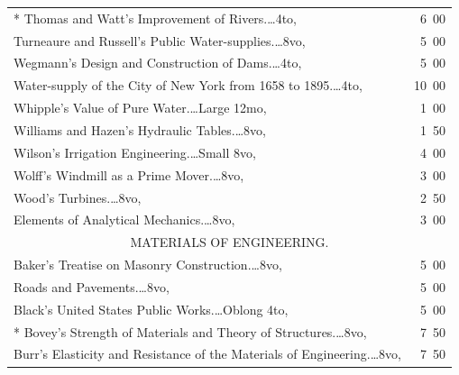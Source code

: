 \documentclass[a4paper,12pt]{book}[2004/02/16]
\theoremstyle{ilemma}
\theoremstyle{itheorem}
\theoremstyle{iother}
\theoremstyle{icorollary}
\theoremstyle{numcorollary}
\theoremstyle{idefinition}
\begin{document}
\begin{longtable}{@{}l@{ }r@{}}
* Thomas and Watt's Improvement of Rivers.\dotfill\ldots 4to, &6\ 00\\

Turneaure and Russell's Public Water-supplies.\dotfill\ldots 8vo, &5\ 00\\

Wegmann's Design and Construction of Dams.\dotfill\ldots 4to, &5\ 00\\

\nopagebreak

\indent Water-supply of the City of New York from 1658 to
1895.\dotfill\ldots 4to, &10\ 00\\

Whipple's Value of Pure Water.\dotfill\ldots Large 12mo, & 1\ 00\\

Williams and Hazen's Hydraulic Tables.\dotfill\ldots 8vo, &1\ 50\\

Wilson's Irrigation Engineering.\dotfill\ldots Small 8vo, &4\ 00\\

Wolff's Windmill as a Prime Mover.\dotfill\ldots 8vo, &3\ 00\\

Wood's Turbines.\dotfill\ldots 8vo, &2\ 50\\

\nopagebreak

\indent Elements of Analytical Mechanics.\dotfill\ldots 8vo, &3\ 00\\[2em]



\multicolumn{2}{c}{MATERIALS OF ENGINEERING.}\\[1em]

\nopagebreak

Baker's Treatise on Masonry Construction.\dotfill\ldots 8vo, &5\ 00\\

\nopagebreak

\indent Roads and Pavements.\dotfill\ldots 8vo, &5\ 00\\

Black's United States Public Works.\dotfill\ldots Oblong 4to, &5\ 00\\

* Bovey's Strength of Materials and Theory of
  Structures.\dotfill\ldots 8vo, &7\ 50\\

Burr's Elasticity and Resistance of the Materials of
Engineering.\dotfill\ldots 8vo, &7\ 50\\


\end{longtable}
\end{document}
